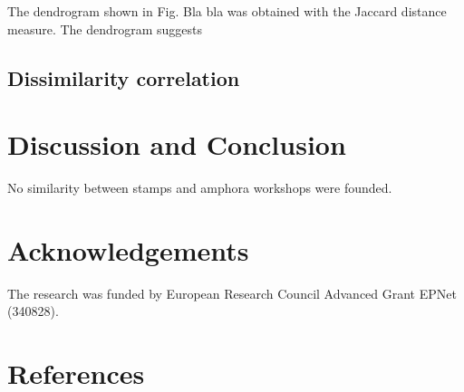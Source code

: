 \documentclass[review]{elsarticle}
\begin{document}
The dendrogram shown in Fig. Bla bla was obtained with the Jaccard distance measure. The dendrogram suggests 

\subsection{Dissimilarity correlation}


\section{Discussion and Conclusion}

No similarity between stamps and amphora workshops were founded. 

\section{Acknowledgements}

The research was funded by European Research Council Advanced Grant
EPNet (340828). 


\section{References}


\end{document}
